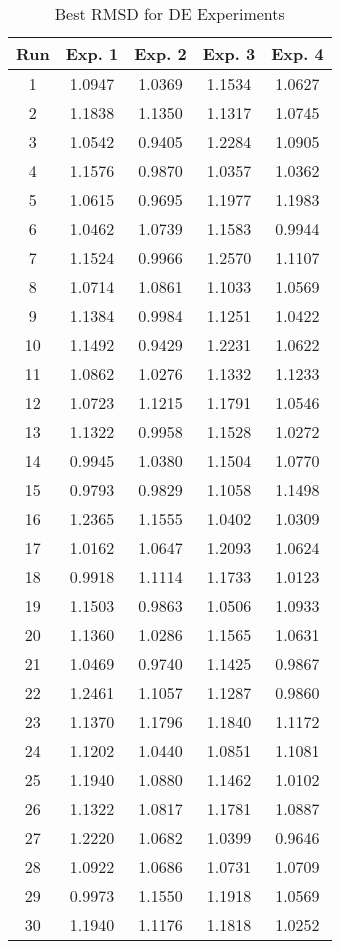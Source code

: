\begin{table}
	\centering
	\begin{tabular}{ | c | c | c | c | c | }
		\hline
		Run & Exp. 1 & Exp. 2 & Exp. 3 & Exp. 4 \\ \hline
		1 & 1.0947 & 1.0369 & 1.1534 & 1.0627 \\ \hline
		2 & 1.1838 & 1.1350 & 1.1317 & 1.0745 \\ \hline
		3 & 1.0542 & 0.9405 & 1.2284 & 1.0905 \\ \hline
		4 & 1.1576 & 0.9870 & 1.0357 & 1.0362 \\ \hline
		5 & 1.0615 & 0.9695 & 1.1977 & 1.1983 \\ \hline
		6 & 1.0462 & 1.0739 & 1.1583 & 0.9944 \\ \hline
		7 & 1.1524 & 0.9966 & 1.2570 & 1.1107 \\ \hline
		8 & 1.0714 & 1.0861 & 1.1033 & 1.0569 \\ \hline
		9 & 1.1384 & 0.9984 & 1.1251 & 1.0422 \\ \hline
		10 & 1.1492 & 0.9429 & 1.2231 & 1.0622 \\ \hline
		11 & 1.0862 & 1.0276 & 1.1332 & 1.1233 \\ \hline
		12 & 1.0723 & 1.1215 & 1.1791 & 1.0546 \\ \hline
		13 & 1.1322 & 0.9958 & 1.1528 & 1.0272 \\ \hline
		14 & 0.9945 & 1.0380 & 1.1504 & 1.0770 \\ \hline
		15 & 0.9793 & 0.9829 & 1.1058 & 1.1498 \\ \hline
		16 & 1.2365 & 1.1555 & 1.0402 & 1.0309 \\ \hline
		17 & 1.0162 & 1.0647 & 1.2093 & 1.0624 \\ \hline
		18 & 0.9918 & 1.1114 & 1.1733 & 1.0123 \\ \hline
		19 & 1.1503 & 0.9863 & 1.0506 & 1.0933 \\ \hline
		20 & 1.1360 & 1.0286 & 1.1565 & 1.0631 \\ \hline
		21 & 1.0469 & 0.9740 & 1.1425 & 0.9867 \\ \hline
		22 & 1.2461 & 1.1057 & 1.1287 & 0.9860 \\ \hline
		23 & 1.1370 & 1.1796 & 1.1840 & 1.1172 \\ \hline
		24 & 1.1202 & 1.0440 & 1.0851 & 1.1081 \\ \hline
		25 & 1.1940 & 1.0880 & 1.1462 & 1.0102 \\ \hline
		26 & 1.1322 & 1.0817 & 1.1781 & 1.0887 \\ \hline
		27 & 1.2220 & 1.0682 & 1.0399 & 0.9646 \\ \hline
		28 & 1.0922 & 1.0686 & 1.0731 & 1.0709 \\ \hline
		29 & 0.9973 & 1.1550 & 1.1918 & 1.0569 \\ \hline
		30 & 1.1940 & 1.1176 & 1.1818 & 1.0252 \\ \hline
	\end{tabular}
	\caption{Best RMSD for DE Experiments}
	\label{table:appendix-de}
\end{table}


